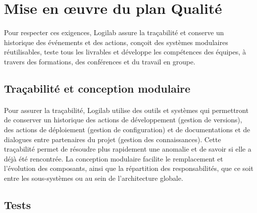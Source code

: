 \documentclass {report}
\begin{document}
\section{Mise en œuvre du plan Qualité}
\paragraph{}
Pour respecter ces exigences, Logilab assure la traçabilité et conserve un historique des événements et des actions, conçoit des systèmes modulaires réutilisables, teste tous les livrables et développe les compétences des équipes, à travers des formations, des conférences et du travail en groupe.
\subsection{Traçabilité et conception modulaire}
\paragraph{}
Pour assurer la traçabilité, Logilab utilise des outils et systèmes  qui permettront de conserver un historique des actions de développement (gestion de versions),  des actions de déploiement (gestion de configuration) et de documentations et de dialogues entre partenaires du projet (gestion des connaissances). Cette traçabilité permet de résoudre plus rapidement une anomalie et de savoir si elle a déjà été rencontrée. La conception modulaire facilite le remplacement et l’évolution des composants, ainsi que la répartition des responsabilités, que ce soit entre les sous-systèmes ou au sein de l’architecture globale. 
\subsection{Tests}
\end{document}
